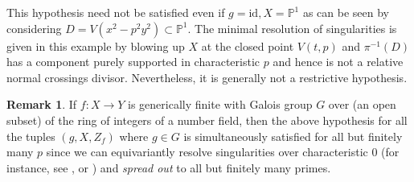 \documentclass[10pt]{article}
\theoremstyle{plain}
\newtheorem{lemma}[theorem]{Lemma}
\theoremstyle{definition}
\newtheorem{remark}[theorem]{Remark}
\numberwithin{equation}{section}
\begin{document}


This hypothesis need not be satisfied even if $g = \mathrm{id}, X = \mathbb P^1$ as can be seen by considering $D = V(x^2 - p^2y^2) \subset \mathbb P^1$. The minimal resolution of singularities is given in this example by blowing up $X$ at the closed point $V(t, p)$ and $\pi^{-1}(D)$ has a component purely supported in characteristic $p$ and hence is not a relative normal crossings divisor. Nevertheless, it is generally not a restrictive hypothesis.

\begin{remark}\label{rmk: char 0 resolutions}
If $f: X \to Y$ is generically finite with Galois group $G$ over (an open subset) of the ring of integers of a number field, then the above hypothesis for all the tuples $(g,X,Z_f)$ where $g \in G$ is simultaneously satisfied for all but finitely many $p$ since we can equivariantly resolve singularities over characteristic $0$ (for instance, see \cite{abramovich1996equivariant},\cite{encinas1998good} or \cite{bierstone1997canonical}) and \emph{spread out} to all but finitely many primes.
\end{remark}
\end{document}
